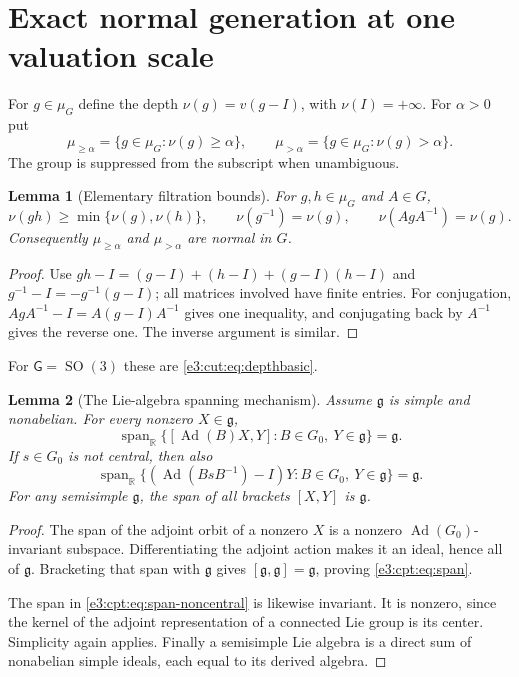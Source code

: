 \documentclass[11pt,letterpaper]{article}
\numberwithin{equation}{section}
\newtheorem{lemma}[lemma]{Lemma}
\theoremstyle{definition}
\theoremstyle{remark}
\newcommand{\R}{\mathbb R}
\newcommand{\SO}{\operatorname{SO}}
\newcommand{\Ad}{\operatorname{Ad}}
\newcommand{\Span}{\operatorname{span}}
\newcommand{\sG}{\mathsf G}
\begin{document}
\section{Exact normal generation at one valuation scale}\label{e3:cpt:sec:normalgeneration}

For $g\in\mu_G$ define the depth $\nu(g)=v(g-I)$, with $\nu(I)=+\infty$. For
$\alpha>0$ put
\[
 \mu_{\ge\alpha}=\{g\in\mu_G:\nu(g)\ge\alpha\},\qquad
 \mu_{>\alpha}=\{g\in\mu_G:\nu(g)>\alpha\}.
\]
The group is suppressed from the subscript when unambiguous.

\begin{lemma}[Elementary filtration bounds]\label{e3:cpt:lem:filtration}
For $g,h\in\mu_G$ and $A\in G$,
\[
 \nu(gh)\ge\min\{\nu(g),\nu(h)\},\qquad
 \nu(g^{-1})=\nu(g),\qquad
 \nu(AgA^{-1})=\nu(g).
\]
Consequently $\mu_{\ge\alpha}$ and $\mu_{>\alpha}$ are normal in $G$.
\end{lemma}
\begin{proof}
Use $gh-I=(g-I)+(h-I)+(g-I)(h-I)$ and $g^{-1}-I=-g^{-1}(g-I)$; all matrices
involved have finite entries. For conjugation, $AgA^{-1}-I=A(g-I)A^{-1}$ gives
one inequality, and conjugating back by $A^{-1}$ gives the reverse one. The
inverse argument is similar.
\end{proof}

For $\sG=\SO(3)$ these are \cref{e3:cut:eq:depthbasic}.

\begin{lemma}[The Lie-algebra spanning mechanism]\label{e3:cpt:lem:span}
Assume $\mathfrak g$ is simple and nonabelian. For every nonzero
$X\in\mathfrak g$,
\begin{equation}\label{e3:cpt:eq:span}
 \Span_{\R}
 \{[\Ad(B)X,Y]:B\in G_0,\ Y\in\mathfrak g\}=\mathfrak g.
\end{equation}
If $s\in G_0$ is not central, then also
\begin{equation}\label{e3:cpt:eq:span-noncentral}
 \Span_{\R}
 \{(\Ad(BsB^{-1})-I)Y:B\in G_0,\ Y\in\mathfrak g\}=\mathfrak g.
\end{equation}
For any semisimple $\mathfrak g$, the span of all brackets $[X,Y]$ is
$\mathfrak g$.
\end{lemma}
\begin{proof}
The span of the adjoint orbit of a nonzero $X$ is a nonzero
$\Ad(G_0)$-invariant subspace. Differentiating the adjoint action makes it an
ideal, hence all of $\mathfrak g$. Bracketing that span with $\mathfrak g$ gives
$[\mathfrak g,\mathfrak g]=\mathfrak g$, proving \cref{e3:cpt:eq:span}.

The span in \cref{e3:cpt:eq:span-noncentral} is likewise invariant. It is
nonzero, since the kernel of the adjoint representation of a connected Lie group
is its center. Simplicity again applies. Finally a semisimple Lie algebra is a
direct sum of nonabelian simple ideals, each equal to its derived algebra.
\end{proof}
\end{document}
